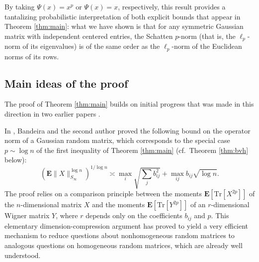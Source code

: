 \documentclass[10pt,reqno]{amsart}
\theoremstyle{definition}
\numberwithin{equation}{section}
\numberwithin{figure}{section}
\numberwithin{table}{section}
\begin{document}
By taking $\Psi(x)=x^p$ or $\Psi(x)=x$, respectively, this result provides 
a tantalizing probabilistic interpretation of both explicit bounds that 
appear in Theorem \ref{thm:main}: what we have shown is that for any 
symmetric Gaussian matrix with independent centered entries, the Schatten 
$p$-norm (that is, the $\ell_p$-norm of its eigenvalues) is of the same 
order as the $\ell_p$-norm of the Euclidean norms of its rows.


\subsection{Main ideas of the proof}

The proof of Theorem \ref{thm:main} builds on initial progress that was 
made in this direction in two earlier papers \cite{BvH16,vH17}. 

In 
\cite[Theorem 1.1]{BvH16}, Bandeira and the second author proved the 
following bound on the operator norm of a Gaussian random matrix, which 
corresponds to the special case $p\sim\log n$ of the first 
inequality of Theorem \ref{thm:main} (cf.\ Theorem \ref{thm:bvh} below):
$$
	(\mathbf{E}\|X\|_{S_{\infty}}^{\log n})^{1/\log n}
	\asymp
	\max_i\sqrt{\sum_j b_{ij}^2} +
	\max_{ij} b_{ij}\sqrt{\log n}.	
$$
The proof relies on a comparison principle between the moments
$\mathbf{E}[\mathrm{Tr}[X^{2p}]]$ of the $n$-dimensional matrix $X$ and 
the moments $\mathbf{E}[\mathrm{Tr}[Y^{2p}]]$ of an $r$-dimensional Wigner 
matrix $Y$, where $r$ depends only on the coefficients $b_{ij}$ and $p$.
This elementary dimension-compression argument has proved to yield a very 
efficient mechanism to reduce questions about nonhomogeneous random 
matrices to analogous questions on homogeneous random matrices, which are 
already well understood.
\end{document}
